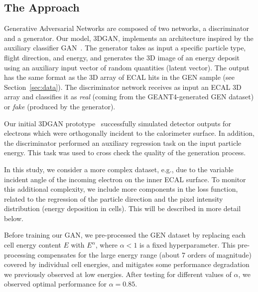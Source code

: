 \subsection*{The Approach}

Generative Adversarial Networks are composed of two networks, a discriminator and a generator. Our model, 3DGAN, implements an architecture inspired by the auxiliary classifier GAN~\cite{acgan}. The generator takes as input a specific particle type, flight direction, and energy, and generates the 3D image of an energy deposit using an auxiliary input vector of random quantities (latent vector). 
The output has the same format as the 3D array of ECAL hits in the GEN sample (see Section~\ref{sec:data}). The discriminator network receives as input an ECAL 3D array and classifies it as {\it real} (coming from the GEANT4-generated GEN dataset) or {\it fake} (produced by the generator).

 Our initial 3DGAN prototype~\cite{NIPS} successfully simulated detector outputs for electrons which were orthogonally incident to the calorimeter surface. In addition, the discriminator performed an auxiliary regression task on the input particle energy. This task was used to cross check the quality of the generation process. 
 
 In this study, we consider a more complex dataset, e.g., due to the variable incident angle of the incoming electron on the inner ECAL surface. To monitor this additional complexity, we include more components in the loss function, related to the regression of the particle direction and the pixel intensity distribution (energy deposition in cells). This will be described in more detail below.

Before training our GAN, we pre-processed the GEN dataset by replacing each cell energy content $E$ with $E^\alpha$, where $\alpha<1$ is a fixed hyperparameter. This pre-processing compensates for the large energy range (about 7 orders of magnitude) covered by individual cell energies, and mitigates some performance degradation we previously observed at low energies. After testing for different values of $\alpha$, we observed optimal performance for $\alpha=0.85$.

